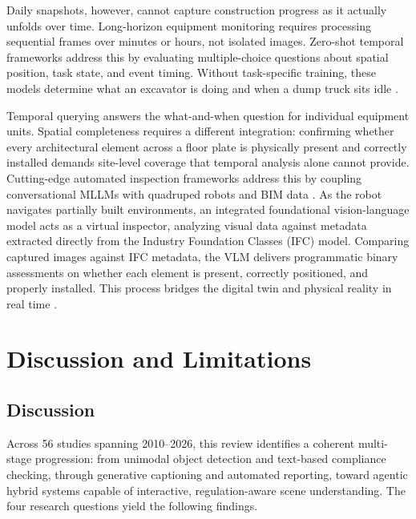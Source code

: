 \documentclass[10pt,letterpaper]{article}
\begin{document}
Daily snapshots, however, cannot capture construction progress as it actually unfolds over time. Long-horizon equipment monitoring requires processing sequential frames over minutes or hours, not isolated images. Zero-shot temporal frameworks address this by evaluating multiple-choice questions about spatial position, task state, and event timing. Without task-specific training, these models determine what an excavator is doing and when a dump truck sits idle \cite{jeoung2025}.

Temporal querying answers the what-and-when question for individual equipment units. Spatial completeness requires a different integration: confirming whether every architectural element across a floor plate is physically present and correctly installed demands site-level coverage that temporal analysis alone cannot provide. Cutting-edge automated inspection frameworks address this by coupling conversational MLLMs with quadruped robots and BIM data \cite{tuomisto2026}. As the robot navigates partially built environments, an integrated foundational vision-language model acts as a virtual inspector, analyzing visual data against metadata extracted directly from the Industry Foundation Classes (IFC) model. Comparing captured images against IFC metadata, the VLM delivers programmatic binary assessments on whether each element is present, correctly positioned, and properly installed. This process bridges the digital twin and physical reality in real time \cite{tuomisto2026}.

\section{Discussion and Limitations}
\label{sec:discussion}

\subsection{Discussion}

Across 56 studies spanning 2010--2026, this review identifies a coherent multi-stage progression: from unimodal object detection and text-based compliance checking, through generative captioning and automated reporting, toward agentic hybrid systems capable of interactive, regulation-aware scene understanding. The four research questions yield the following findings.
\end{document}

